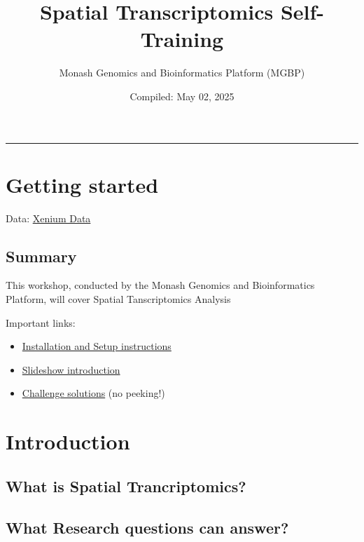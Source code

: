 \documentclass[
]{book}
\title{Spatial Transcriptomics Self-Training}
\author{Monash Genomics and Bioinformatics Platform (MGBP)}
\date{Compiled: May 02, 2025}
\providecommand{\tightlist}{%
  \setlength{\itemsep}{0pt}\setlength{\parskip}{0pt}}
\begin{document}
\maketitle

{
\setcounter{tocdepth}{1}
\tableofcontents
}
\begin{center}\rule{0.5\linewidth}{0.5pt}\end{center}

\chapter{Getting started}\label{getting-started}

Data:
\href{https://www.10xgenomics.com/datasets/ffpe-human-colorectal-cancer-data-with-human-immuno-oncology-profiling-panel-and-custom-add-on-1-standard}{Xenium Data}

\section{Summary}\label{summary}

This workshop, conducted by the Monash Genomics and Bioinformatics Platform, will cover Spatial Tanscriptomics Analysis

Important links:

\begin{itemize}
\tightlist
\item
  \href{set-up.html}{Installation and Setup instructions}
\item
  \href{../slides}{Slideshow introduction}
\item
  \href{solutions.html}{Challenge solutions} (no peeking!)
\end{itemize}

\chapter{Introduction}\label{introduction}

\section{What is Spatial Trancriptomics?}\label{what-is-spatial-trancriptomics}

\section{What Research questions can answer?}\label{what-research-questions-can-answer}
\end{document}
